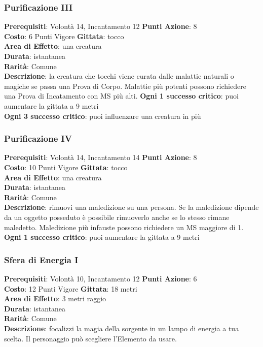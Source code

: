 \documentclass[12pt,a4paper,twoside,openany]{book}
\begin{document}
\begin{multicols}{2}
\subsubsection*{Purificazione III}
\textbf{Prerequisiti}: Volontà 14, Incantamento 12
\textbf{Punti Azione}: 8\\
\textbf{Costo}: 6 Punti Vigore
\textbf{Gittata}: tocco \\
\textbf{Area di Effetto}: una creatura\\
\textbf{Durata}: istantanea\\
\textbf{Rarità}: Comune\\
\textbf{Descrizione}: la creatura che tocchi viene curata dalle malattie naturali o magiche se passa una Prova di Corpo. Malattie più potenti possono richiedere una Prova di Incatamento con MS più alti.
\textbf{Ogni 1 successo critico}: puoi aumentare la gittata a 9 metri\\
\textbf{Ogni 3 successo critico}: puoi influenzare una creatura in più\\

\subsubsection*{Purificazione IV}
\textbf{Prerequisiti}: Volontà 14, Incantamento 14
\textbf{Punti Azione}: 8\\
\textbf{Costo}: 10 Punti Vigore
\textbf{Gittata}: tocco \\
\textbf{Area di Effetto}: una creatura\\
\textbf{Durata}: istantanea\\
\textbf{Rarità}: Comune\\
\textbf{Descrizione}: rimuovi una maledizione su una persona. Se la maledizione dipende da un oggetto posseduto è possibile rimuoverlo anche se lo stesso rimane maledetto. Maledizione più infauste possono richiedere un MS maggiore di 1.
\textbf{Ogni 1 successo critico}: puoi aumentare la gittata a 9 metri\\


\subsubsection*{Sfera di Energia I}
\textbf{Prerequisiti}: Volontà 10, Incantamento 12
\textbf{Punti Azione}: 6\\
\textbf{Costo}: 12 Punti Vigore
\textbf{Gittata}: 18 metri\\
\textbf{Area di Effetto}: 3 metri raggio\\
\textbf{Durata}: istantanea\\
\textbf{Rarità}: Comune\\
\textbf{Descrizione}: focalizzi la magia della sorgente in un lampo di energia a tua scelta. Il personaggio può scegliere l'Elemento da usare.


\end{multicols}
\end{document}
